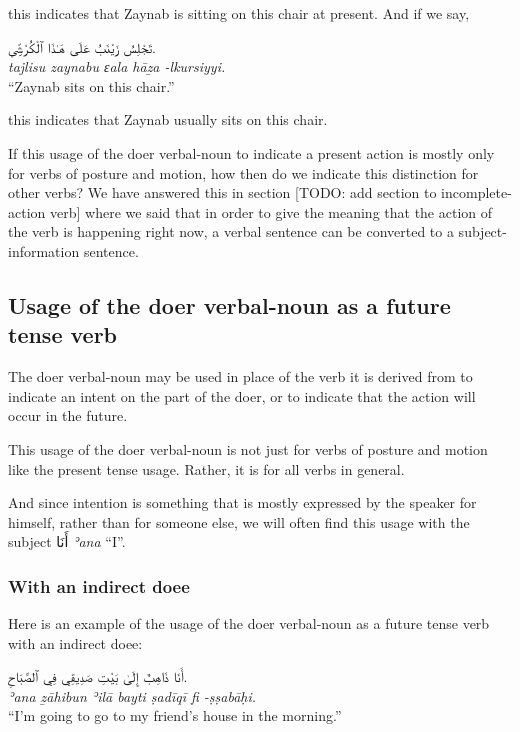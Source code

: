 \documentclass[
  10pt,
]{book}
\begin{document}
this indicates that Zaynab is sitting on this chair at present. And if we say,

\foreignlanguage{arabic}{تَجْلِسُ زَيْنَبُ عَلَى هَـٰذَا ٱلْکُرْسِيِّ.}\\
\emph{tajlisu zaynabu ɛala hāẕa -lkursiyyi.}\\
\enquote{Zaynab sits on this chair.}

this indicates that Zaynab usually sits on this chair.

If this usage of the doer verbal-noun to indicate a present action is mostly only for verbs of posture and motion, how then do we indicate this distinction for other verbs? We have answered this in section {[}TODO: add section to incomplete-action verb{]} where we said that in order to give the meaning that the action of the verb is happening right now, a verbal sentence can be converted to a subject-information sentence.

\subsection{Usage of the doer verbal-noun as a future tense verb}\label{doer-verbal-noun-for-intended-future-action}

The doer verbal-noun may be used in place of the verb it is derived from to indicate an intent on the part of the doer, or to indicate that the action will occur in the future.

This usage of the doer verbal-noun is not just for verbs of posture and motion like the present tense usage. Rather, it is for all verbs in general.

And since intention is something that is mostly expressed by the speaker for himself, rather than for someone else, we will often find this usage with the subject \foreignlanguage{arabic}{أَنَا} \emph{ʾana} \enquote{I}.

\subsubsection{With an indirect doee}\label{with-an-indirect-doee-1}

Here is an example of the usage of the doer verbal-noun as a future tense verb with an indirect doee:

\foreignlanguage{arabic}{أَنَا ذَاهِبٌ إِلَىٰ بَيْتِ صَدِيقِي فِي ٱلصَّبَاحِ.}\\
\emph{ʾana ẕāhibun ʾilā bayti ṣadīqī fi -ṣṣabāḥi.}\\
\enquote{I'm going to go to my friend's house in the morning.}
\end{document}
